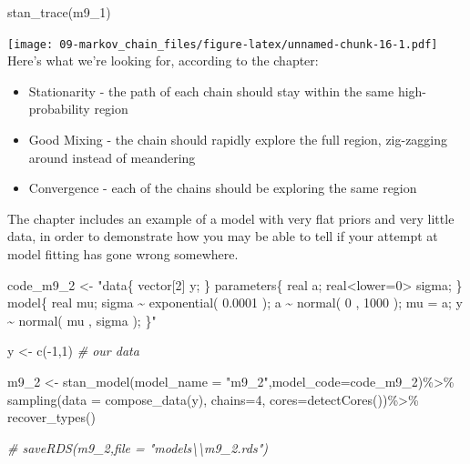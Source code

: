 \documentclass[
]{book}
\newenvironment{Shaded}{\begin{snugshade}}{\end{snugshade}}
\newcommand{\AttributeTok}[1]{\textcolor[rgb]{0.77,0.63,0.00}{#1}}
\newcommand{\CommentTok}[1]{\textcolor[rgb]{0.56,0.35,0.01}{\textit{#1}}}
\newcommand{\DecValTok}[1]{\textcolor[rgb]{0.00,0.00,0.81}{#1}}
\newcommand{\FunctionTok}[1]{\textcolor[rgb]{0.00,0.00,0.00}{#1}}
\newcommand{\NormalTok}[1]{#1}
\newcommand{\OtherTok}[1]{\textcolor[rgb]{0.56,0.35,0.01}{#1}}
\newcommand{\SpecialCharTok}[1]{\textcolor[rgb]{0.00,0.00,0.00}{#1}}
\newcommand{\StringTok}[1]{\textcolor[rgb]{0.31,0.60,0.02}{#1}}
\providecommand{\tightlist}{%
  \setlength{\itemsep}{0pt}\setlength{\parskip}{0pt}}
\begin{document}
\begin{Shaded}
\begin{Highlighting}[]
\FunctionTok{stan\_trace}\NormalTok{(m9\_1)}
\end{Highlighting}
\end{Shaded}

\texttt{[image: 09-markov\_chain\_files/figure-latex/unnamed-chunk-16-1.pdf]}
Here's what we're looking for, according to the chapter:

\begin{itemize}
\tightlist
\item
  Stationarity - the path of each chain should stay within the same high-probability region
\item
  Good Mixing - the chain should rapidly explore the full region, zig-zagging around instead of meandering
\item
  Convergence - each of the chains should be exploring the same region
\end{itemize}

The chapter includes an example of a model with very flat priors and very little data, in order to demonstrate how you may be able to tell if your attempt at model fitting has gone wrong somewhere.

\begin{Shaded}
\begin{Highlighting}[]
\NormalTok{code\_m9\_2 }\OtherTok{\textless{}{-}} 
\StringTok{"data\{}
\StringTok{    vector[2] y;}
\StringTok{\}}
\StringTok{parameters\{}
\StringTok{    real a;}
\StringTok{    real\textless{}lower=0\textgreater{} sigma;}
\StringTok{\}}
\StringTok{model\{}
\StringTok{    real mu;}
\StringTok{    sigma \textasciitilde{} exponential( 0.0001 );}
\StringTok{    a \textasciitilde{} normal( 0 , 1000 );}
\StringTok{    mu = a;}
\StringTok{    y \textasciitilde{} normal( mu , sigma );}
\StringTok{\}"}

\NormalTok{y }\OtherTok{\textless{}{-}} \FunctionTok{c}\NormalTok{(}\SpecialCharTok{{-}}\DecValTok{1}\NormalTok{,}\DecValTok{1}\NormalTok{) }\CommentTok{\# our data}

\NormalTok{m9\_2 }\OtherTok{\textless{}{-}} \FunctionTok{stan\_model}\NormalTok{(}\AttributeTok{model\_name =} \StringTok{"m9\_2"}\NormalTok{,}\AttributeTok{model\_code=}\NormalTok{code\_m9\_2)}\SpecialCharTok{\%\textgreater{}\%} 
          \FunctionTok{sampling}\NormalTok{(}\AttributeTok{data =} \FunctionTok{compose\_data}\NormalTok{(y), }\AttributeTok{chains=}\DecValTok{4}\NormalTok{, }\AttributeTok{cores=}\FunctionTok{detectCores}\NormalTok{())}\SpecialCharTok{\%\textgreater{}\%}
          \FunctionTok{recover\_types}\NormalTok{()}

\CommentTok{\# saveRDS(m9\_2,file = "models\textbackslash{}\textbackslash{}m9\_2.rds")}
\end{Highlighting}
\end{Shaded}
\end{document}
